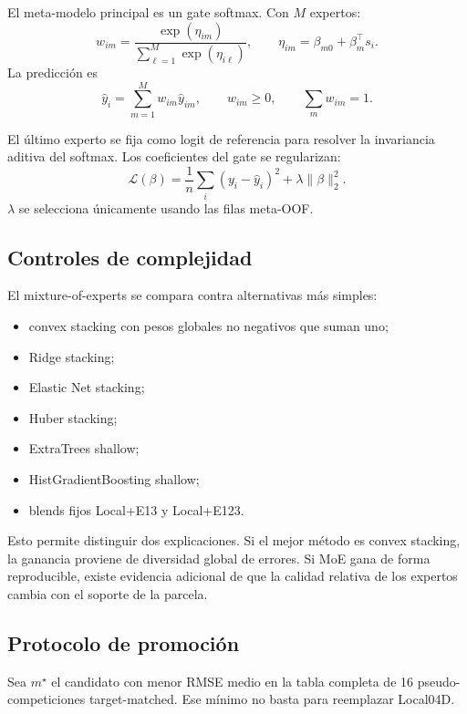 El meta-modelo principal es un gate softmax. Con $M$ expertos:
\begin{equation}
w_{im}
=
\frac{\exp(\eta_{im})}
{\sum_{\ell=1}^{M}\exp(\eta_{i\ell})},
\qquad
\eta_{im}=\beta_{m0}+\beta_m^\top s_i.
\label{eq:cp05-softmax-gate}
\end{equation}
La predicción es
\begin{equation}
\hat y_i
=
\sum_{m=1}^{M}w_{im}\hat y_{im},
\qquad
w_{im}\ge0,
\qquad
\sum_m w_{im}=1.
\label{eq:cp05-moe}
\end{equation}

El último experto se fija como logit de referencia para resolver la invariancia aditiva del
softmax. Los coeficientes del gate se regularizan:
\[
\mathcal L(\beta)
=
\frac{1}{n}\sum_i
(y_i-\hat y_i)^2
+
\lambda\|\beta\|_2^2.
\]
$\lambda$ se selecciona únicamente usando las filas meta-OOF.

\subsection{Controles de complejidad}

El mixture-of-experts se compara contra alternativas más simples:
\begin{itemize}
\item convex stacking con pesos globales no negativos que suman uno;
\item Ridge stacking;
\item Elastic Net stacking;
\item Huber stacking;
\item ExtraTrees shallow;
\item HistGradientBoosting shallow;
\item blends fijos Local+E13 y Local+E123.
\end{itemize}

Esto permite distinguir dos explicaciones. Si el mejor método es convex stacking, la ganancia
proviene de diversidad global de errores. Si MoE gana de forma reproducible, existe evidencia
adicional de que la calidad relativa de los expertos cambia con el soporte de la parcela.

\subsection{Protocolo de promoción}

Sea $m^\star$ el candidato con menor RMSE medio en la tabla completa de 16 pseudo-competiciones
target-matched. Ese mínimo no basta para reemplazar Local04D.

